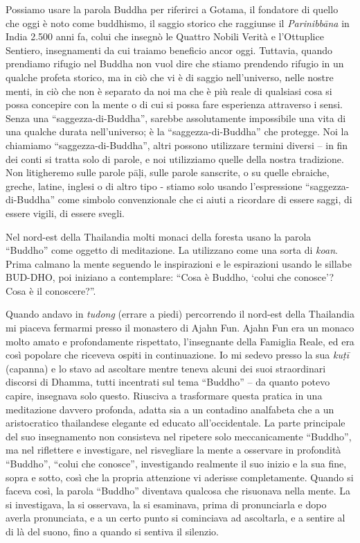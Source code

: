 Possiamo usare la parola Buddha per riferirci a Gotama, il fondatore di
quello che oggi è noto come buddhismo, il saggio storico che raggiunse
il \emph{Parinibbāna} in India 2.500 anni fa, colui che insegnò le
Quattro Nobili Verità e l'Ottuplice Sentiero, insegnamenti da cui
traiamo beneficio ancor oggi. Tuttavia, quando prendiamo rifugio nel
Buddha non vuol dire che stiamo prendendo rifugio in un qualche profeta
storico, ma in ciò che vi è di saggio nell'universo, nelle nostre menti,
in ciò che non è separato da noi ma che è più reale di qualsiasi cosa si
possa concepire con la mente o di cui si possa fare esperienza
attraverso i sensi. Senza una ``saggezza-di-Buddha'', sarebbe
assolutamente impossibile una vita di una qualche durata nell'universo;
è la ``saggezza-di-Buddha'' che protegge. Noi la chiamiamo
``saggezza-di-Buddha'', altri possono utilizzare termini diversi -- in
fin dei conti si tratta solo di parole, e noi utilizziamo quelle della
nostra tradizione. Non litigheremo sulle parole pāḷi, sulle parole
sanscrite, o su quelle ebraiche, greche, latine, inglesi o di altro tipo
- stiamo solo usando l'espressione ``saggezza-di-Buddha'' come simbolo
convenzionale che ci aiuti a ricordare di essere saggi, di essere
vigili, di essere svegli.

Nel nord-est della Thailandia molti monaci della foresta usano la parola
``Buddho'' come oggetto di meditazione. La utilizzano come una sorta di
\emph{koan}. Prima calmano la mente seguendo le inspirazioni e le
espirazioni usando le sillabe BUD-DHO, poi iniziano a contemplare:
``Cosa è Buddho, `colui che conosce'? Cosa è il conoscere?''.

Quando andavo in \emph{tudong} (errare a piedi) percorrendo il nord-est
della Thailandia mi piaceva fermarmi presso il monastero di Ajahn Fun.
Ajahn Fun era un monaco molto amato e profondamente rispettato,
l'insegnante della Famiglia Reale, ed era così popolare che riceveva
ospiti in continuazione. Io mi sedevo presso la sua \emph{kuṭī}
(capanna) e lo stavo ad ascoltare mentre teneva alcuni dei suoi
straordinari discorsi di Dhamma, tutti incentrati sul tema ``Buddho'' --
da quanto potevo capire, insegnava solo questo. Riusciva a trasformare
questa pratica in una meditazione davvero profonda, adatta sia a un
contadino analfabeta che a un aristocratico thailandese elegante ed
educato all'occidentale. La parte principale del suo insegnamento non
consisteva nel ripetere solo meccanicamente ``Buddho'', ma nel
riflettere e investigare, nel risvegliare la mente a osservare in
profondità ``Buddho'', ``colui che conosce'', investigando realmente il
suo inizio e la sua fine, sopra e sotto, così che la propria attenzione
vi aderisse completamente. Quando si faceva così, la parola ``Buddho''
diventava qualcosa che risuonava nella mente. La si investigava, la si
osservava, la si esaminava, prima di pronunciarla e dopo averla
pronunciata, e a un certo punto si cominciava ad ascoltarla, e a sentire
al di là del suono, fino a quando si sentiva il silenzio.

